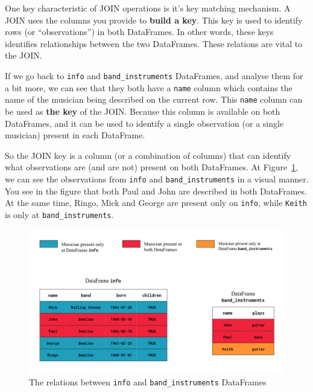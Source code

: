 \documentclass[
  11pt,
  letterpaper,
  DIV=11,
  numbers=noendperiod]{scrreprt}
\begin{document}
One key characteristic of JOIN operations is it's key matching
mechanism. A JOIN uses the columns you provide to \textbf{build a key}.
This key is used to identify rows (or ``observations'') in both
DataFrames. In other words, these keys identifies relationships between
the two DataFrames. These relations are vital to the JOIN.

If we go back to \texttt{info} and \texttt{band\_instruments}
DataFrames, and analyse them for a bit more, we can see that they both
have a \texttt{name} column which contains the name of the musician
being described on the current row. This \texttt{name} column can be
used as \textbf{the key} of the JOIN. Because this column is available
on both DataFrames, and it can be used to identify a single observation
(or a single musician) present in each DataFrame.

So the JOIN key is a column (or a combination of columns) that can
identify what observations are (and are not) present on both DataFrames.
At Figure~\ref{fig-keys-comparison}, we can see the observations from
\texttt{info} and \texttt{band\_instruments} in a visual manner. You see
in the figure that both Paul and John are described in both DataFrames.
At the same time, Ringo, Mick and George are present only on
\texttt{info}, while \texttt{Keith} is only at
\texttt{band\_instruments}.

\begin{figure}

{\centering \includegraphics{Chapters/./../Figures/keys_comparacao.png}

}

\caption{\label{fig-keys-comparison}The relations between \texttt{info}
and \texttt{band\_instruments} DataFrames}

\end{figure}
\end{document}
